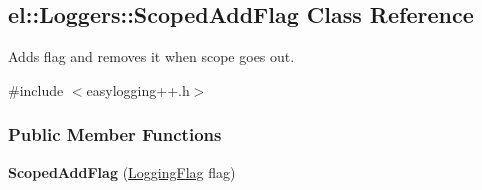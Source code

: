 \hypertarget{a00078}{}\subsection{el\+:\+:Loggers\+:\+:Scoped\+Add\+Flag Class Reference}
\label{a00078}


Adds flag and removes it when scope goes out.  




{\ttfamily \#include $<$easylogging++.\+h$>$}

\subsubsection*{Public Member Functions}
\begin{DoxyCompactItemize}
\item 
\hypertarget{a00078_a13e0b1052cd1a7a15fae63fd6454d598}{}{\bfseries Scoped\+Add\+Flag} (\hyperlink{a00183_a2784aacd04cb7816ac1c0b20fcbf83cb}{Logging\+Flag} flag)\label{a00078_a13e0b1052cd1a7a15fae63fd6454d598}

\end{DoxyCompactItemize}
